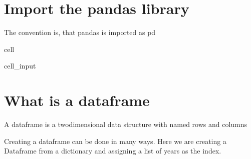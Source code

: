 \documentclass[letterpaper,10pt,english]{jupyterBook}
\begin{document}
\sphinxAtStartPar
{}


\section{Import the pandas library}
\label{\detokenize{content/notebooks/pandas/dataframes:import-the-pandas-library}}
\sphinxAtStartPar
The convention is, that pandas is imported as pd

\begin{sphinxuseclass}{cell}\begin{sphinxVerbatimInput}

\begin{sphinxuseclass}{cell_input}
\begin{sphinxVerbatim}[commandchars=\\\{\}]
    
\end{sphinxVerbatim}

\end{sphinxuseclass}\end{sphinxVerbatimInput}

\end{sphinxuseclass}

\section{What is a dataframe}
\label{\detokenize{content/notebooks/pandas/dataframes:what-is-a-dataframe}}
\sphinxAtStartPar
A dataframe is a two\sphinxhyphen{}dimensional data structure with named rows and columns 

\sphinxAtStartPar
Creating a dataframe can be done in many ways. Here we are creating a Dataframe from a dictionary and  assigning a list of years as the index.
\end{document}
